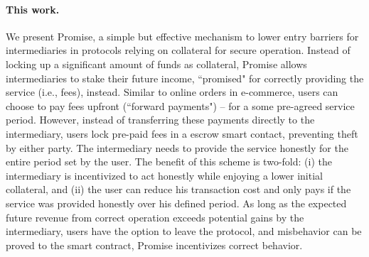 \documentclass[runningheads]{llncs}
\newcommand{\sys}{Promise\xspace}
\begin{document}
\paragraph{This work.}
We present \sys, a simple but effective mechanism to lower entry barriers for intermediaries in protocols relying on collateral for secure operation.
Instead of locking up a significant amount of funds as collateral, \sys allows intermediaries to stake their future income, ``promised" for correctly providing the service (i.e., fees), instead.
Similar to online orders in e-commerce, users can choose to pay fees upfront (``forward payments") -- for a some pre-agreed service period.
However, instead of transferring these payments directly to the intermediary, users lock pre-paid fees in a escrow smart contact, preventing theft by either party. 
The intermediary needs to provide the service honestly for the entire period set by the user.
The benefit of this scheme is two-fold: (i) the intermediary is incentivized to act honestly while enjoying a lower initial collateral, and (ii) the user can reduce his transaction cost and only pays if the service was provided honestly over his defined period. %
As long as the expected future revenue from correct operation exceeds potential gains by the intermediary, users have the option to leave the protocol, and misbehavior can be proved to the smart contract, \sys incentivizes correct behavior.
\end{document}
